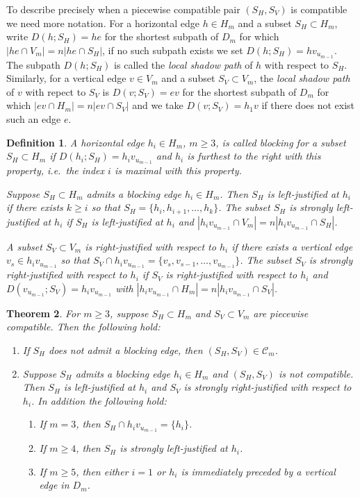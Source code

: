 \documentclass{amsart}
\newtheorem{theorem}{Theorem}[section]
\newtheorem{definition}[theorem]{Definition}
\numberwithin{equation}{section}
\newcommand{\cC}{\mathcal{C}}
\begin{document}
To describe precisely when a piecewise compatible pair $(S_H,S_V)$ is compatible we need more notation.
For a horizontal edge $h\in H_m$ and a subset $S_H\subset H_m$, write $D(h;S_H)=he$ for the shortest subpath of $D_m$ for which $|he\cap V_m|=n|he\cap S_H|$, if no such subpath exists we set $D(h;S_H)=hv_{u_{m-1}}$.
The subpath $D(h;S_H)$ is called the \emph{local shadow path} of $h$ with respect to $S_H$.
Similarly, for a vertical edge $v\in V_m$ and a subset $S_V\subset V_m$, the \emph{local shadow path} of $v$ with repect to $S_V$ is $D(v;S_V)=ev$ for the shortest subpath of $D_m$ for which $|ev\cap H_m|=n|ev\cap S_V|$ and we take $D(v;S_V)=h_1v$ if there does not exist such an edge $e$.
\begin{definition}
  \cite[Definition 3.17]{rupel}
  A horizontal edge $h_i\in H_m$, $m\ge3$, is called \emph{blocking} for a subset $S_H\subset H_m$ if $D(h_i;S_H)=h_iv_{u_{m-1}}$ and $h_i$ is furthest to the right with this property, i.e.\ the index $i$ is maximal with this property. 

  Suppose $S_H\subset H_m$ admits a blocking edge $h_i\in H_m$.
  Then $S_H$ is \emph{left-justified at $h_i$} if there exists $k\ge i$ so that $S_H=\{h_i,h_{i+1},\ldots,h_k\}$.
  The subset $S_H$ is \emph{strongly left-justified at $h_i$} if $S_H$ is left-justified at $h_i$ and $|h_iv_{u_{m-1}}\cap V_m|=n|h_iv_{u_{m-1}}\cap S_H|$.

  A subset $S_V\subset V_m$ is \emph{right-justified with respect to $h_i$} if there exists a vertical edge $v_s\in h_iv_{u_{m-1}}$ so that $S_V\cap h_iv_{u_{m-1}}=\{v_s,v_{s-1},\ldots,v_{u_{m-1}}\}$.
  The subset $S_V$ is \emph{strongly right-justified with respect to $h_i$} if $S_V$ is right-justified with respect to $h_i$ and $D(v_{u_{m-1}};S_V)=h_iv_{u_{m-1}}$ with $|h_iv_{u_{m-1}}\cap H_m|=n|h_iv_{u_{m-1}}\cap S_V|$.
\end{definition}

\begin{theorem}
  \cite[Theorem 3.20 and Corollary 3.22]{rupel}
  \label{th:blocking edge conditions}
  For $m\ge3$, suppose $S_H\subset H_m$ and $S_V\subset V_m$ are piecewise compatible. 
  Then the following hold:
  \begin{enumerate}
    \item If $S_H$ does not admit a blocking edge, then $(S_H,S_V)\in\cC_m$.
    \item Suppose $S_H$ admits a blocking edge $h_i\in H_m$ and $(S_H,S_V)$ is not compatible.
      Then $S_H$ is left-justified at $h_i$ and $S_V$ is strongly right-justified with respect to $h_i$.
      In addition the following hold:
      \begin{enumerate}
        \item If $m=3$, then $S_H\cap h_iv_{u_{m-1}}=\{h_i\}$.
        \item If $m\ge4$, then $S_H$ is strongly left-justified at $h_i$.
        \item If $m\ge5$, then either $i=1$ or $h_i$ is immediately preceded by a vertical edge in $D_m$.
      \end{enumerate}
  \end{enumerate}
\end{theorem}
\end{document}

